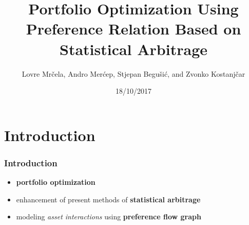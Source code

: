 \documentclass[11pt]{beamer}
\newcommand{\q}{\left}
\newcommand{\w}{\right}
\newcommand{\prob}[1]{\operatorname{\mathbf{P} \q(#1\w)}}
\renewcommand{\alert}{\textbf}
\begin{document}
  \author{Lovre Mrčela, Andro Merćep, Stjepan Begušić, and Zvonko Kostanjčar}
  \title{Portfolio Optimization Using Preference Relation Based on Statistical Arbitrage}
  \date{18/10/2017}

  \begin{frame}[plain]
  \maketitle
  \end{frame}

%  
  \section{Introduction}
  \begin{frame}
    \frametitle{Introduction}
    \begin{itemize}
    \item \alert{portfolio optimization}
    \item enhancement of present methods of \alert{statistical arbitrage}
    \item modeling \emph{asset interactions} using \alert{preference flow graph}
    \end{itemize}
  \end{frame}

\end{document}
